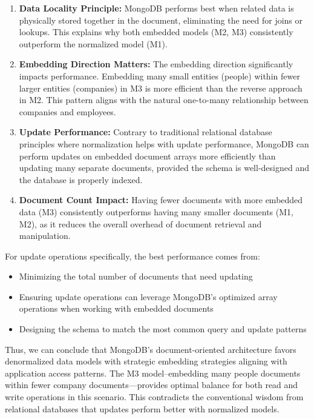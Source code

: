 \begin{enumerate}
    \item \textbf{Data Locality Principle:} MongoDB performs best when related data is physically stored together in the document, eliminating the need for joins or lookups. This explains why both embedded models (M2, M3) consistently outperform the normalized model (M1).
    
    \item \textbf{Embedding Direction Matters:} The embedding direction significantly impacts performance. Embedding many small entities (people) within fewer larger entities (companies) in M3 is more efficient than the reverse approach in M2. This pattern aligns with the natural one-to-many relationship between companies and employees.
    
    \item \textbf{Update Performance:} Contrary to traditional relational database principles where normalization helps with update performance, MongoDB can perform updates on embedded document arrays more efficiently than updating many separate documents, provided the schema is well-designed and the database is properly indexed.
    
    \item \textbf{Document Count Impact:} Having fewer documents with more embedded data (M3) consistently outperforms having many smaller documents (M1, M2), as it reduces the overall overhead of document retrieval and manipulation.
\end{enumerate}

For update operations specifically, the best performance comes from:

\begin{itemize}
    \item Minimizing the total number of documents that need updating
    \item Ensuring update operations can leverage MongoDB's optimized array operations when working with embedded documents
    \item Designing the schema to match the most common query and update patterns
\end{itemize}

Thus, we can conclude that MongoDB's document-oriented architecture favors denormalized data models with strategic embedding strategies aligning with application access patterns. The M3 model--embedding many people documents within fewer company documents—provides optimal balance for both read and write operations in this scenario. This contradicts the conventional wisdom from relational databases that updates perform better with normalized models.
